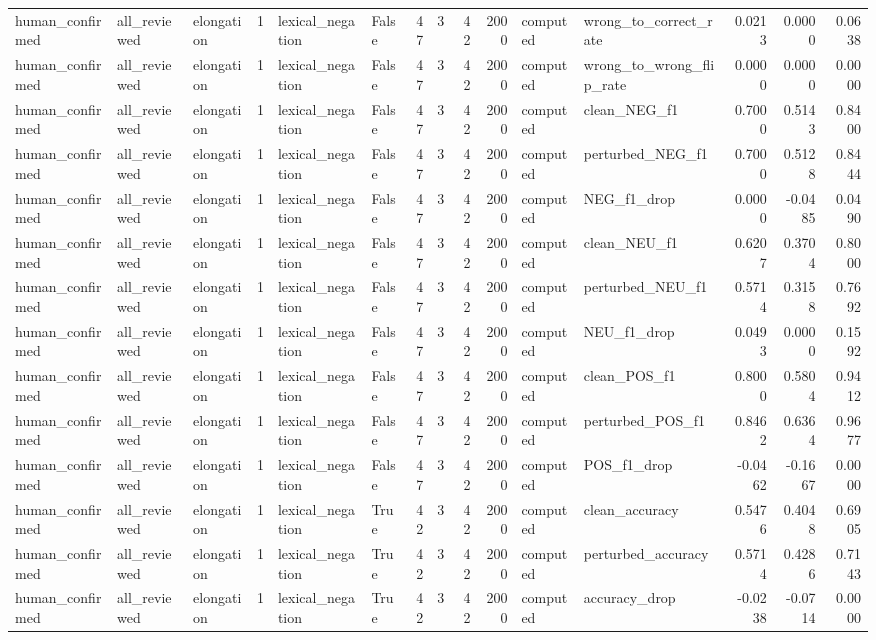 \begin{tabular}{lllrllrrrrllrrr}
human_confirmed & all_reviewed & elongation & 1 & lexical_negation & False & 47 & 3 & 42 & 2000 & computed & wrong_to_correct_rate & 0.0213 & 0.0000 & 0.0638 \\
human_confirmed & all_reviewed & elongation & 1 & lexical_negation & False & 47 & 3 & 42 & 2000 & computed & wrong_to_wrong_flip_rate & 0.0000 & 0.0000 & 0.0000 \\
human_confirmed & all_reviewed & elongation & 1 & lexical_negation & False & 47 & 3 & 42 & 2000 & computed & clean_NEG_f1 & 0.7000 & 0.5143 & 0.8400 \\
human_confirmed & all_reviewed & elongation & 1 & lexical_negation & False & 47 & 3 & 42 & 2000 & computed & perturbed_NEG_f1 & 0.7000 & 0.5128 & 0.8444 \\
human_confirmed & all_reviewed & elongation & 1 & lexical_negation & False & 47 & 3 & 42 & 2000 & computed & NEG_f1_drop & 0.0000 & -0.0485 & 0.0490 \\
human_confirmed & all_reviewed & elongation & 1 & lexical_negation & False & 47 & 3 & 42 & 2000 & computed & clean_NEU_f1 & 0.6207 & 0.3704 & 0.8000 \\
human_confirmed & all_reviewed & elongation & 1 & lexical_negation & False & 47 & 3 & 42 & 2000 & computed & perturbed_NEU_f1 & 0.5714 & 0.3158 & 0.7692 \\
human_confirmed & all_reviewed & elongation & 1 & lexical_negation & False & 47 & 3 & 42 & 2000 & computed & NEU_f1_drop & 0.0493 & 0.0000 & 0.1592 \\
human_confirmed & all_reviewed & elongation & 1 & lexical_negation & False & 47 & 3 & 42 & 2000 & computed & clean_POS_f1 & 0.8000 & 0.5804 & 0.9412 \\
human_confirmed & all_reviewed & elongation & 1 & lexical_negation & False & 47 & 3 & 42 & 2000 & computed & perturbed_POS_f1 & 0.8462 & 0.6364 & 0.9677 \\
human_confirmed & all_reviewed & elongation & 1 & lexical_negation & False & 47 & 3 & 42 & 2000 & computed & POS_f1_drop & -0.0462 & -0.1667 & 0.0000 \\
human_confirmed & all_reviewed & elongation & 1 & lexical_negation & True & 42 & 3 & 42 & 2000 & computed & clean_accuracy & 0.5476 & 0.4048 & 0.6905 \\
human_confirmed & all_reviewed & elongation & 1 & lexical_negation & True & 42 & 3 & 42 & 2000 & computed & perturbed_accuracy & 0.5714 & 0.4286 & 0.7143 \\
human_confirmed & all_reviewed & elongation & 1 & lexical_negation & True & 42 & 3 & 42 & 2000 & computed & accuracy_drop & -0.0238 & -0.0714 & 0.0000 \\

\end{tabular}
